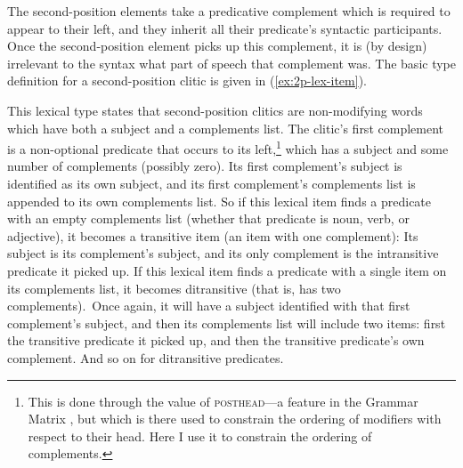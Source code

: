 The second-position elements take a predicative complement which is required to appear to their left, and they inherit all their predicate's syntactic participants. Once the second-position element picks up this complement, it is (by design) irrelevant to the syntax what part of speech that complement was. The basic type definition for a second-position clitic is given in (\ref{ex:2p-lex-item}).

\begin{singlespacing}
\ex \label{ex:2p-lex-item}
\xe
\end{singlespacing}

This lexical type states that second-position clitics are non-modifying words which have both a subject and a complements list. The clitic's first complement is a non-optional predicate that occurs to its left,\footnote{This is done through the value of \textsc{posthead}---a feature in the Grammar Matrix \citep{bender2002}, but which is there used to constrain the ordering of modifiers with respect to their head. Here I use it to constrain the ordering of complements.} which has a subject and some number of complements (possibly zero). Its first complement's subject is identified as its own subject, and its first complement's complements list is appended to its own complements list. So if this lexical item finds a predicate with an empty complements list (whether that predicate is noun, verb, or adjective), it becomes a transitive item (an item with one complement): Its subject is its complement's subject, and its only complement is the intransitive predicate it picked up. If this lexical item finds a predicate with a single item on its complements list, it becomes ditransitive (that is, has two complements). Once again, it will have a subject identified with that first complement's subject, and then its complements list will include two items: first the transitive predicate it picked up, and then the transitive predicate's own complement. And so on for ditransitive predicates.

